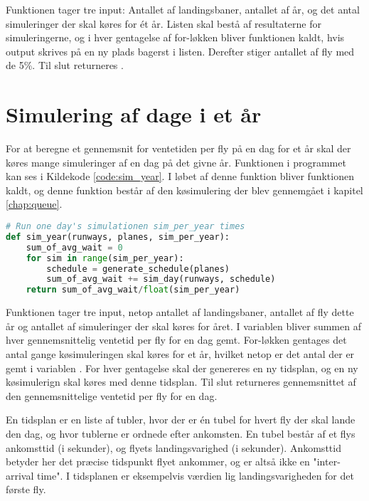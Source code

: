 Funktionen tager tre input: Antallet af landingsbaner, antallet af år, og det antal simuleringer der skal køres for ét år.
Listen  skal bestå af resultaterne for simuleringerne, og i hver gentagelse af for-løkken bliver funktionen  kaldt, hvis output skrives på en ny plads bagerst i listen.
Derefter stiger antallet af fly med de 5\%.
Til slut returneres .

\section{Simulering af dage i et år}
For at beregne et gennemsnit for ventetiden per fly på en dag for et år skal der køres mange simuleringer af en dag på det givne år.
Funktionen  i programmet kan ses i Kildekode \ref{code:sim_year}.
I løbet af denne funktion bliver funktionen  kaldt, og denne funktion består af den køsimulering der blev gennemgået i kapitel \ref{chap:queue}. 

\begin{lstlisting}[language=Python, caption={sim\_year-funktionen i airplanes.py}, label=code:sim_year]
# Run one day's simulationen sim_per_year times
def sim_year(runways, planes, sim_per_year):
    sum_of_avg_wait = 0    
    for sim in range(sim_per_year):
        schedule = generate_schedule(planes)
        sum_of_avg_wait += sim_day(runways, schedule)
    return sum_of_avg_wait/float(sim_per_year)
\end{lstlisting}

Funktionen  tager tre input, netop antallet af landingsbaner, antallet af fly dette år og antallet af simuleringer der skal køres for året.
I variablen  bliver summen af hver gennemsnittelig ventetid per fly for en dag gemt.
For-løkken gentages det antal gange køsimuleringen skal køres for et år, hvilket netop er det antal der er gemt i variablen .
For hver gentagelse skal der genereres en ny tidsplan, og en ny køsimulerign skal køres med denne tidsplan.
Til slut returneres gennemsnittet af den gennemsnittelige ventetid per fly for en dag.

En tidsplan er en liste af tubler, hvor der er én tubel for hvert fly der skal lande den dag, og hvor tublerne er ordnede efter ankomsten.
En tubel består af et flys ankomsttid (i sekunder), og flyets landingsvarighed (i sekunder).
Ankomsttid betyder her det præcise tidspunkt flyet ankommer, og er altså ikke en "inter-arrival time".
I tidsplanen er eksempelvis værdien  lig landingsvarigheden for det første fly.

